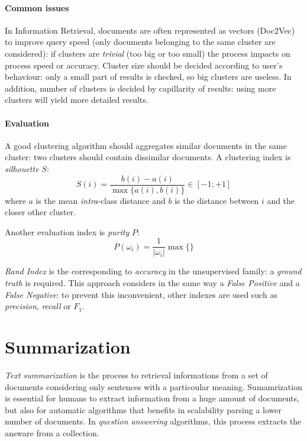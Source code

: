 \documentclass[11pt, a4page]{article}
\begin{document}
\subsection{Common issues}
In Information Retrieval, documents are often represented as vectors (Doc2Vec) to improve query speed (only documents belonging to the same cluster are considered): if clusters are \textit{trivial} (too big or too small) the process impacts on process speed or accuracy.
Cluster size should be decided according to user's behaviour: only a small part of results is checked, so big clusters are useless.
In addition, number of clusters is decided by capillarity of results: using more clusters will yield more detailed results.

\subsection{Evaluation}
A good clustering algorithm should aggregates similar documents in the same cluster: two clusters should contain dissimilar documents.
A clustering index is \textit{silhouette} $S$:
\begin{equation*}
  S(i) = \frac{b(i) - a(i)}{\max\{a(i), b(i)\}} \in [-1; +1]
\end{equation*}
where $a$ is the mean \textit{intra}-class distance and $b$ is the distance between $i$ and the closer other cluster.

Another evaluation index is \textit{purity} $P$:
\begin{equation*}
  P(\omega_i) = \frac{1}{|\omega_i|}\max\{ \}
\end{equation*}

\textit{Rand Index} is the corresponding to \textit{accuracy} in the unsupervised family: a \textit{ground truth} is required.
This approach considers in the same way a \textit{False Positive} and a \textit{False Negative}: to prevent this inconvenient, other indexes are used such as \textit{precision}, \textit{recall} or $F_1$.

\newpage
\part{Summarization}
\textit{Text summarization} is the process to retrieval informations from a set of documents considering only sentences with a particoular meaning.
Sumamrization is essential for humans to extract information from a huge amount of documents, but also for automatic algorithms that benefits in scalability parsing a lower number of documents.
In \textit{question answering} algorithms, this process extracts the answare from a collection.
\end{document}
